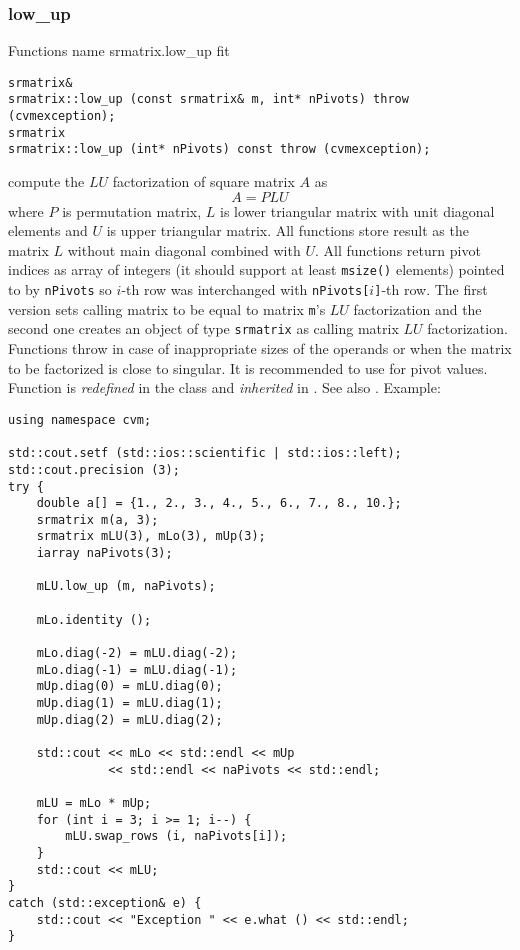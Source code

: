 \subsubsection{low\_up}
Functions%
\pdfdest name {srmatrix.low_up} fit
\begin{verbatim}
srmatrix& 
srmatrix::low_up (const srmatrix& m, int* nPivots) throw (cvmexception);
srmatrix
srmatrix::low_up (int* nPivots) const throw (cvmexception);
\end{verbatim}
compute the $LU$ factorization of square matrix $A$ as
\begin{equation*}
A=PLU
\end{equation*}
where $P$ is  permutation matrix, $L$ is  lower
triangular matrix with unit diagonal
elements and $U$ is  upper triangular matrix.
All  functions store  result as the matrix $L$ without
main diagonal combined with $U$. All  functions
return pivot indices as  array of integers
(it should support at least \verb"msize()" elements)
pointed to by \verb"nPivots" so \hbox{$i$-th} row
was interchanged with \hbox{\verb"nPivots["$i$\verb"]"-th} row.
The first version sets  calling matrix to be equal to matrix
\verb"m"'s $LU$ factorization and the second one
creates an object of type \verb"srmatrix" as  calling matrix
$LU$ factorization.
Functions throw 
in case of inappropriate
sizes of the operands or when the matrix to be factorized is close to
singular. It is recommended to use 
for pivot values.
Function is \emph{redefined} in the class
and \emph{inherited} in .
See also
.
Example:
\begin{Verbatim}
using namespace cvm;

std::cout.setf (std::ios::scientific | std::ios::left); 
std::cout.precision (3);
try {
    double a[] = {1., 2., 3., 4., 5., 6., 7., 8., 10.};
    srmatrix m(a, 3);
    srmatrix mLU(3), mLo(3), mUp(3);
    iarray naPivots(3);

    mLU.low_up (m, naPivots);

    mLo.identity ();

    mLo.diag(-2) = mLU.diag(-2);
    mLo.diag(-1) = mLU.diag(-1);
    mUp.diag(0) = mLU.diag(0);
    mUp.diag(1) = mLU.diag(1);
    mUp.diag(2) = mLU.diag(2);

    std::cout << mLo << std::endl << mUp 
              << std::endl << naPivots << std::endl;

    mLU = mLo * mUp;
    for (int i = 3; i >= 1; i--) {
        mLU.swap_rows (i, naPivots[i]);
    }
    std::cout << mLU;
}
catch (std::exception& e) {
    std::cout << "Exception " << e.what () << std::endl;
}
\end{Verbatim}
